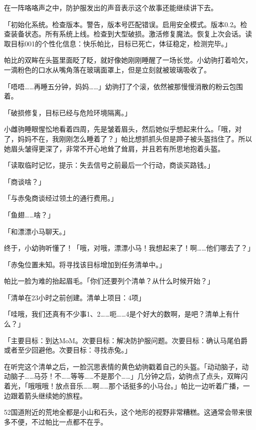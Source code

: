 \horizonline


在一阵咯咯声之中，防护服发出的声音表示这个故事还能继续讲下去。

「{\mt 初始化系统。检查版本。警告，版本号匹配错误。启用安全模式。版本0.2。检查装备状态。所有系统上线。检查到大型破损。激活修复魔法。恢复上次会话。读取目标001的个性化信息：快乐帕比，目标已死亡，体征稳定，检测完毕。}」

帕比的双眸在头盔里面眨了眨，就好像她刚刚睡醒了一场长觉。小幼驹打着哈欠，一滴粉色的口水从嘴角落在玻璃面罩上，但是立刻就被玻璃吸收了。

「唔唔……再睡五分钟，妈妈……」幼驹打了个滚，依然被那慢慢消散的粉云包围着。

「{\mt 破损修复，目标已经与危险环境隔离。}」

小雌驹睡眼惺忪地看着四周，先是皱着眉头，然后她似乎想起来什么。「哦，对了，妈妈不在，我刚刚怎么睡着了？」帕比想抓抓头但是蹄子被头盔挡住了。所以她眉头皱得更深了，非常不开心地耸了耸肩，并且若有所思地抱着头盔。

「{\mt 读取临时记忆，提示：失去信号之前最后一个行动，商谈买路钱。}」

「商谈啥？」

「{\mt 与赤兔商谈经过领土的通行费用。}」

「鱼翅……啥？」

「{\mt 和漂漂小马聊天。}」

终于，小幼驹听懂了！「哦，对哦，漂漂小马！我想起来了！啊……他们哪去了？」

「{\mt 赤兔位置未知。将寻找该目标增加到任务清单中。}」

帕比一脸为难的抬起眉毛。「你们还要列个清单？从什么时候开始？」

「{\mt 清单在23小时之前创建。清单上项目：4项}」

「哇哦，我们还真有不少事1、2……呃……4是个好大的数啊，是吧？清单上有什么？」

「{\mt 主要目标：到达MoM。次要目标：解决防护服问题。次要目标：确认马尾伯爵或者至少回避他。次要目标：寻找赤兔。}」

在听完这个清单之后，一脸沉思表情的黄色幼驹戳着自己的头盔。「动动脑子，动动脑子……马芬！不……等等……不是那个……」几分钟之后，幼驹点了点头，双眸闪着光，「哦哦哦！放点音乐……啊……那个话挺多的小马台。」帕比一边听着广播，一边跟着箭头继续她的旅程。

52国道附近的荒地全都是小山和石头，这个地形的视野非常糟糕。这通常会带来很多不便，不过帕比一点都不在乎。

